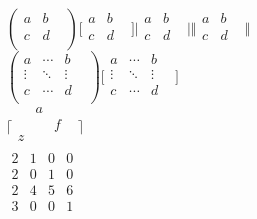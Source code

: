 \documentclass[12pt,a4paper]{article}
\begin{document}
$(\begin{matrix}
a & b & \\
c & d & \\
\end{matrix}
)\lbrack \begin{matrix}
a & b & \\
c & d & \\
\end{matrix}
\rbrack \vert \begin{matrix}
a & b & \\
c & d & \\
\end{matrix}
\vert \Vert \begin{matrix}
a & b & \\
c & d & \\
\end{matrix}
\Vert $\\


$(\begin{matrix}
a & \cdots & b & \\
\vdots & \ddots & \vdots & \\
c & \cdots & d & \\
\end{matrix}
)\lbrack \begin{matrix}
a & \cdots & b & \\
\vdots & \ddots & \vdots & \\
c & \cdots & d & \\
\end{matrix}
\rbrack $\\


$\lceil \begin{matrix}
 & a & & \\
 & & f & \\
z & & & \\
\end{matrix}
\rceil $\\


$\begin{matrix}
2 & 1 & 0 & 0 & \\
2 & 0 & 1 & 0 & \\
2 & 4 & 5 & 6 & \\
3 & 0 & 0 & 1 & \\
\end{matrix}
$\\
\end{document}
